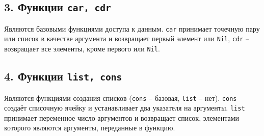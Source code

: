 \subsection*{3. Функции {\texttt{car, cdr}}}

Являются базовыми функциями доступа к данным. {\texttt{car}} принимает точечную пару или список в качестве аргумента и возвращает первый элемент или {\texttt{Nil}}, {\texttt{cdr}} -- возвращает все элементы, кроме первого или {\texttt{Nil}}.

\subsection*{4. Функции {\texttt{list, cons}}}

Являются функциями создания списков ({\texttt{cons}} -- базовая, {\texttt{list}} -- нет). {\texttt{cons}} создаёт списочную ячейку и устанавливает два указателя на аргументы. {\texttt{list}} принимает переменное число аргументов и возвращает список, элементами которого являются аргументы, переданные в функцию.